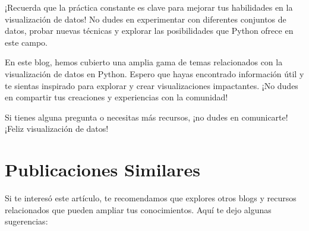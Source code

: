 \documentclass[
  a4paper,
]{article}
\begin{document}
¡Recuerda que la práctica constante es clave para mejorar tus
habilidades en la visualización de datos! No dudes en experimentar con
diferentes conjuntos de datos, probar nuevas técnicas y explorar las
posibilidades que Python ofrece en este campo.

En este blog, hemos cubierto una amplia gama de temas relacionados con
la visualización de datos en Python. Espero que hayas encontrado
información útil y te sientas inspirado para explorar y crear
visualizaciones impactantes. ¡No dudes en compartir tus creaciones y
experiencias con la comunidad!

Si tienes alguna pregunta o necesitas más recursos, ¡no dudes en
comunicarte! ¡Feliz visualización de datos!

\hypertarget{publicaciones-similares}{%
\section{Publicaciones Similares}\label{publicaciones-similares}}

Si te interesó este artículo, te recomendamos que explores otros blogs y
recursos relacionados que pueden ampliar tus conocimientos. Aquí te dejo
algunas sugerencias:
\end{document}
